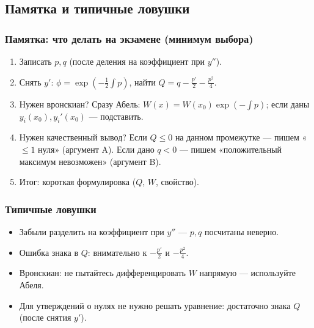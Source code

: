 \subsection{Памятка и типичные ловушки}\label{sec:ode2-memo-traps}

\subsubsection{Памятка: что делать на экзамене (минимум выбора)}

\begin{enumerate}
\item Записать $p,q$ (после деления на коэффициент при $y''$).
\item Снять $y'$: $\phi=\exp(-\tfrac12\int p)$, найти $Q=q-\tfrac{p'}{2}-\tfrac{p^2}{4}$.
\item Нужен вронскиан? Сразу Абель: $W(x)=W(x_0)\exp(-\int p)$; если даны $y_i(x_0),y_i'(x_0)$ — подставить.
\item Нужен качественный вывод? Если $Q\le 0$ на данном промежутке — пишем «$\le 1$ нуля» (аргумент A).
Если дано $q<0$ — пишем «положительный максимум невозможен» (аргумент B).
\item Итог: короткая формулировка ($Q$, $W$, свойство).
\end{enumerate}

\subsubsection{Типичные ловушки}

\begin{itemize}
\item Забыли разделить на коэффициент при $y''$ — $p,q$ посчитаны неверно.
\item Ошибка знака в $Q$: внимательно к $-\tfrac{p'}{2}$ и $-\tfrac{p^2}{4}$.
\item Вронскиан: не пытайтесь дифференцировать $W$ напрямую — используйте Абеля.
\item Для утверждений о нулях не нужно решать уравнение: достаточно знака $Q$ (после снятия $y'$).
\end{itemize}
